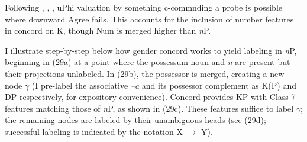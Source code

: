 \documentclass[output=paper
,modfonts
,nonflat]{langsci/langscibook}
\begin{document}
\noindent Following \citet{Bejar_Rezac2009}, \citet{Carstens2016}, \citet{Toosarvandani_Van_Urk2014}, uPhi valuation by something c-commnding a probe is possible where downward Agree fails. This accounts for the inclusion of number features in concord on K, though Num is merged higher than \textit{n}P.

I illustrate step-by-step below how gender concord works to yield labeling in \textit{n}P, beginning in (29a) at a point where the possessum noun and \textit{n} are present but their projections unlabeled. In (29b), the possessor is merged, creating a new node $\gamma$ (I pre-label the associative \textit{–a} and its possessor complement as K(P) and DP respectively, for expository convenience). Concord provides KP with Class 7 features matching those of \textit{n}P, as shown in (29c). These features suffice to label $\gamma$;  the remaining nodes are labeled by their unambiguous heads (see (29d); successful labeling is indicated by the notation X $\rightarrow$ Y).
\end{document}
